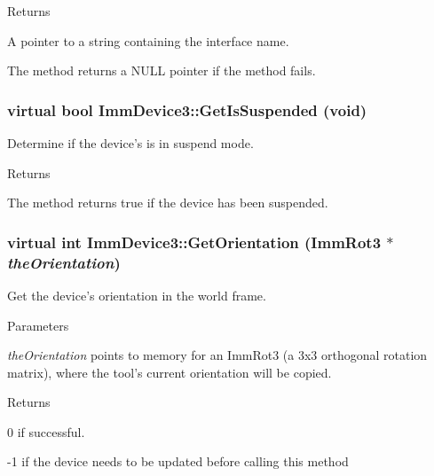 \begin{DoxyReturn}{Returns}

\end{DoxyReturn}
A pointer to a string containing the interface name.

The method returns a NULL pointer if the method fails. \hypertarget{classImmDevice3_a6540c9d22cde63911c3e0655a0e3c8ee}{
\subsubsection[{GetIsSuspended}]{\setlength{\rightskip}{0pt plus 5cm}virtual bool ImmDevice3::GetIsSuspended (void)}}
\label{classImmDevice3_a6540c9d22cde63911c3e0655a0e3c8ee}
Determine if the device's is in suspend mode.

\begin{DoxyReturn}{Returns}

\end{DoxyReturn}
The method returns true if the device has been suspended. \hypertarget{classImmDevice3_a70c07b916e8a73a346b55c74f60685d0}{
\subsubsection[{GetOrientation}]{\setlength{\rightskip}{0pt plus 5cm}virtual int ImmDevice3::GetOrientation (ImmRot3 $\ast$ {\em theOrientation})}}
\label{classImmDevice3_a70c07b916e8a73a346b55c74f60685d0}
Get the device's orientation in the world frame.


\begin{DoxyParams}{Parameters}
\item[{\em theOrientation}]points to memory for an ImmRot3 (a 3x3 orthogonal rotation matrix), where the tool's current orientation will be copied.\end{DoxyParams}
\begin{DoxyReturn}{Returns}

\end{DoxyReturn}
0 if successful.

-\/1 if the device needs to be updated before calling this method

